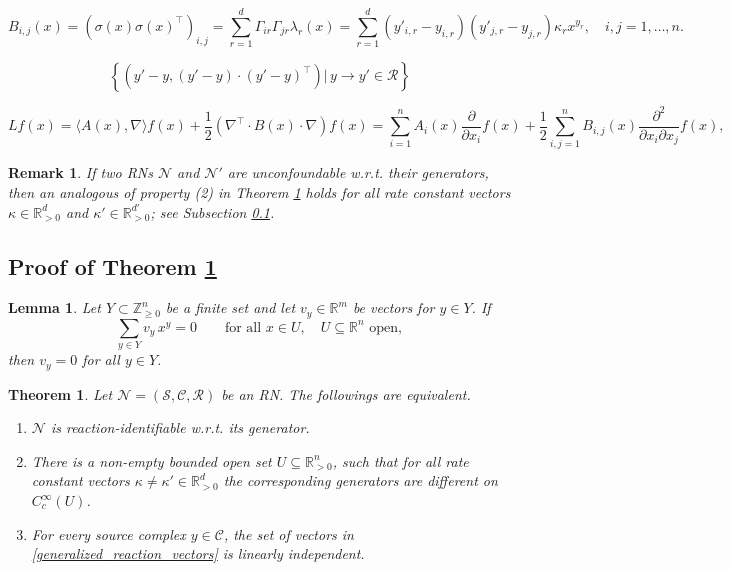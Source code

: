 \documentclass[10pt,a4paper]{amsart}
\newtheorem{theorem}{Theorem}
\newtheorem{remark}{Remark}
\newtheorem{lemma}{Lemma}
\def\R{\mathbb{R}}
\def\cC{\mathcal{C}}
\def\cN{\mathcal{N}}
\def\cR{\mathcal{R}}
\def\cS{\mathcal{S}}
\def\la{\lambda}
\begin{document}
\begin{equation}\label{diffusion_matrix}
      B_{i,j}(x)=
(\sigma(x) \sigma(x)^{\intercal})_{i,j} = \sum_{r=1}^d \Gamma_{ir}\Gamma_{jr} \la_r(x) = \sum_{r = 1}^d (y'_{i,r} - y_{i,r}) (y'_{j,r} - y_{j,r}) \kappa_r x^{y_r}, \quad i, j = 1, \dots, n.
\end{equation}

\begin{equation}\label{generalized_reaction_vectors}
    \left\{\left(y'-y,(y' - y)\cdot (y' - y)^{\intercal}\right) \big| \, y\to y'\in\cR\right\}
\end{equation}

\begin{equation}\label{generator}
    Lf(x) = \langle A(x), \nabla \rangle f{(x)}+{\frac{1}{2}} (\nabla^{\intercal} \cdot B (x) \cdot \nabla) f{(x)} = \sum_{i = 1}^n A_i(x)\frac{\partial}{\partial x_i}f(x)+\frac{1}{2}\sum_{i,j = 1}^n B_{i,j}(x)\frac{\partial^2}{\partial x_i\partial x_j}f(x),
\end{equation}

\begin{remark}\label{rmk-theorem1}
   If two RNs $\cN$ and $\cN'$ are unconfoundable w.r.t. their generators, then an analogous of property
(2) in Theorem \ref{theorem1} holds for all rate constant vectors $\kappa \in \mathbb{R}^d_{>0}$ and $\kappa' \in \mathbb{R}^{d'}_{>0}$; see Subsection \ref{prf_theorem1}.
\end{remark}

\subsection{Proof of Theorem \ref{theorem1}} \label{prf_theorem1} 

\begin{lemma}\label{lem:monomial_independence}
Let $Y\subset \mathbb Z_{\ge 0}^n$ be a finite set and let $v_y\in\mathbb R^m$ be vectors for $y\in Y$. If
\[
\sum_{y\in Y} v_y\,x^y = 0 \qquad \text{for all } x\in U,\quad U\subseteq\mathbb R^n\text{ open},
\]
then $v_y=0$ for all $y\in Y$.
\end{lemma}

\begin{theorem}\label{theorem1}
Let $\cN = (\cS, \cC, \cR)$ be an RN. The followings are equivalent.
\begin{enumerate}
\item $\cN$ is reaction-identifiable w.r.t. its generator.

\item There is a non-empty bounded open set $U\subseteq\R^n_{>0}$, such that for all rate constant vector{s} $\kappa \neq \kappa'\in\R^d_{>0}$ the corresponding generators are different on $C^{\infty}_c(U)$.

\item For every source complex $y\in \cC$, the set of vectors in \eqref{generalized_reaction_vectors}
is linearly independent.

\end{enumerate}

\end{theorem}
\end{document}

